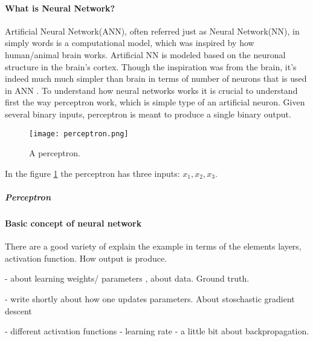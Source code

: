 \paragraph{What is Neural Network?}
Artificial Neural Network(ANN), often referred just as Neural Network(NN),
in simply words is a computational model, which was inspired by how human/animal
brain works. Artificial NN is modeled based on the neuronal structure in the brain's
cortex. Though the inspiration was from the brain,
it's indeed much much simpler than brain in terms of number of neurons that is used
in ANN \cite{Goodfellow-et-al-2016}.
To understand how neural networks works it is crucial to understand first the
way perceptron work, which is simple type of an artificial neuron.
Given several binary inputs, perceptron is meant to produce a single binary output.
\begin{figure}[H]
	\texttt{[image: perceptron.png]}
	\caption{A perceptron.} %
	\label{igm:model} %
\end{figure}
In the figure \ref{igm:model} the perceptron has three inputs: $x_1, x_2, x_3$.





 \cite{rosenblatt1962principles}
\subparagraph{Perceptron}



\paragraph{Basic concept of neural network}
There are a good variety of
explain the example in terms of the elements
layers, activation function. How output is produce.

- about learning weights/ parameters , about data. Ground truth.

- write shortly about how one updates parameters. About stoschastic gradient descent

- different activation functions
- learning rate
- a little bit about backpropagation.

